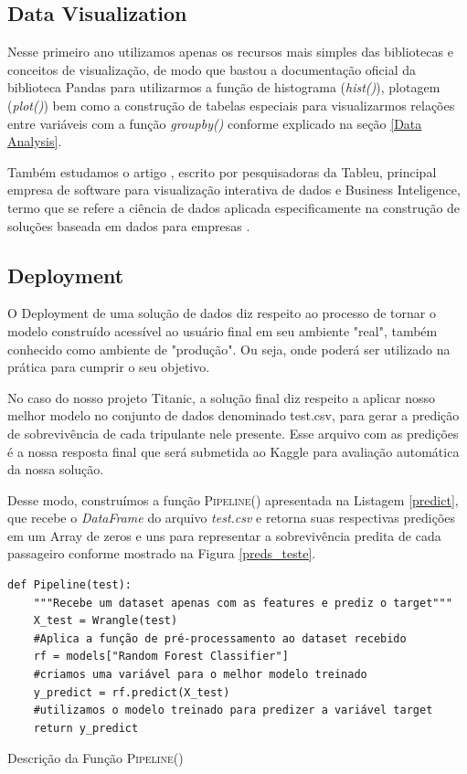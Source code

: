 \documentclass{article}
\begin{document}
\subsection{Data Visualization}
Nesse primeiro ano utilizamos apenas os recursos mais simples das bibliotecas e conceitos de visualização, de modo que bastou a documentação oficial da biblioteca Pandas para utilizarmos a função de histograma (\emph{hist()}), plotagem (\emph{plot()}) bem como a construção de tabelas especiais para visualizarmos relações entre variáveis com a função \emph{groupby()} conforme explicado na seção \ref{Data Analysis}. 

Também estudamos o artigo \cite{BATON}, escrito por pesquisadoras da Tableu, principal empresa de software para visualização interativa de dados e Business Inteligence, termo que se refere a ciência de dados aplicada especificamente na construção de soluções baseada em dados para empresas \cite{negash2008business}.

\subsection{Deployment}
O Deployment de uma solução de dados diz respeito ao processo de tornar o modelo construído acessível ao usuário final em seu ambiente "real", também conhecido como ambiente de "produção". Ou seja, onde poderá ser utilizado na prática para cumprir o seu objetivo. 

No caso do nosso projeto Titanic, a solução final diz respeito a aplicar nosso melhor modelo no conjunto de dados denominado test.csv,  para gerar a predição de sobrevivência de cada tripulante nele presente. Esse arquivo com as predições é a nossa resposta final que será submetida ao Kaggle para avaliação automática da nossa solução. 

Desse modo, construímos a função \textsc{Pipeline()} apresentada na Listagem \ref{predict}, que recebe o \emph{DataFrame} do arquivo \emph{test.csv} e retorna suas respectivas predições em um Array de zeros e uns para representar a sobrevivência predita de cada passageiro conforme mostrado na Figura \ref{preds_teste}. 
\begin{listing}[!ht]
\begin{verbatim}
def Pipeline(test):
    """Recebe um dataset apenas com as features e prediz o target"""
    X_test = Wrangle(test)
    #Aplica a função de pré-processamento ao dataset recebido
    rf = models["Random Forest Classifier"]
    #criamos uma variável para o melhor modelo treinado
    y_predict = rf.predict(X_test) 
    #utilizamos o modelo treinado para predizer a variável target
    return y_predict 
\end{verbatim}
\caption{Descrição da Função \textsc{Pipeline()}}
\label{predict}
\end{listing}
\end{document}
